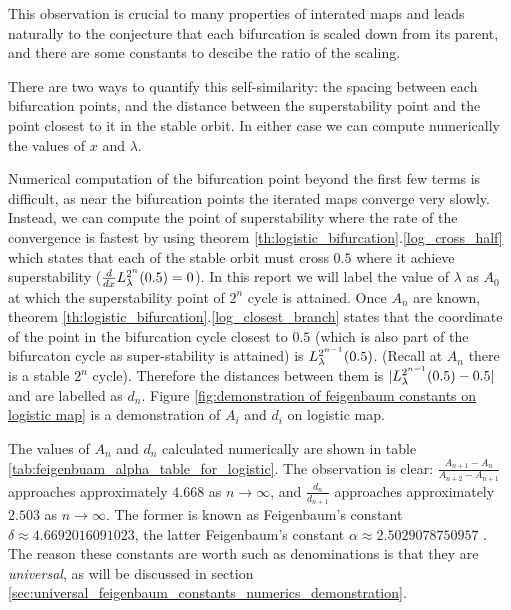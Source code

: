  This observation is crucial to many properties of interated maps and leads naturally to the conjecture that each bifurcation is scaled down from its parent, and there are some constants to descibe the ratio of the scaling. 

 There are two ways to quantify this self-similarity: the spacing between each bifurcation points, and the distance between the superstability point and the point closest to it in the stable orbit. 
 In either case we can compute numerically the values of $x$ and $\lambda$.

 Numerical computation of the bifurcation point beyond the first few terms is difficult, as near the bifurcation points the iterated maps converge very slowly.
 Instead, we can compute the point of superstability where the rate of the convergence is fastest by using theorem \ref{th:logistic_bifurcation}.\ref{log_cross_half} which states that each of the stable orbit must cross $0.5$ where it achieve superstability ($\frac{d}{dx}L_{\lambda}^{2^n}(0.5) = 0$).
In this report we will label the value of $\lambda$ as $A_0$ at which the superstability point of $2^n$ cycle is attained.
Once $A_n$ are known, theorem \ref{th:logistic_bifurcation}.\ref{log_closest_branch} states that the coordinate of the point in the bifurcation cycle closest to $0.5$ (which is also part of the bifurcaton cycle as super-stability is attained) is $L_{\lambda}^{2^{n-1}}(0.5)$. (Recall at $A_n$ there is a stable $2^n$ cycle).
Therefore the distances between them is $|L_{\lambda}^{2^{n-1}}(0.5) - 0.5|$ and are labelled as $d_n$.
Figure \ref{fig:demonstration of feigenbaum constants on logistic map} is a demonstration of $A_i$ and $d_i$ on logistic map.

The values of $A_n$ and $d_n$ calculated numerically are shown in table \ref{tab:feigenbuam_alpha_table_for_logistic}. 
The observation is clear:
$\frac{A_{n+1}-A_n}{A_{n+2}-A_{n+1}}$ approaches approximately $4.668$ as $n \rightarrow \infty$, and $\frac{d_n}{d_{n+1}}$ approaches approximately $2.503$ as $n \rightarrow \infty$. 
The former is known as Feigenbaum's constant $\delta \approx 4.6692016091023$, the latter Feigenbaum's constant $\alpha \approx 2.5029078750957$ \cite{F1}.
The reason these constants are worth such as denominations is that they are \emph{universal}, as will be discussed in section \ref{sec:universal_feigenbaum_constants_numerics_demonstration}.

